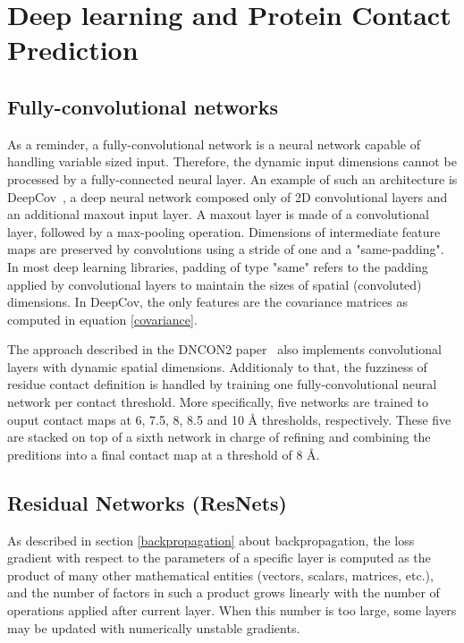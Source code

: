 \section{Deep learning and Protein Contact Prediction}

    \subsection{Fully-convolutional networks}

        As a reminder, a fully-convolutional network is a neural network capable
        of handling variable sized input. Therefore, the dynamic input dimensions
        cannot be processed by a fully-connected neural layer.
        An example of such an architecture is DeepCov~\cite{doi:10.1093/bioinformatics/bty341},
        a deep neural network composed only of 2D convolutional layers and an additional
        maxout input layer. A maxout layer is made of a convolutional layer, followed
        by a max-pooling operation. Dimensions of intermediate feature maps are preserved
        by convolutions using a stride of one and a "same-padding". In most deep learning
        libraries, padding of type "same" refers to the padding applied by convolutional layers
        to maintain the sizes of spatial (convoluted) dimensions.
        In DeepCov, the only features are the covariance matrices as computed
        in equation \ref{covariance}.

        The approach described in the DNCON2 paper~\cite{doi:10.1093/bioinformatics/bty341}
        also implements convolutional layers with dynamic spatial dimensions.
        Additionaly to that, the fuzziness of residue contact definition is handled
        by training one fully-convolutional neural network per contact threshold.
        More specifically, five networks are trained to ouput contact maps at 6, 7.5, 8, 8.5 and 10 \AA{}
        thresholds, respectively. These five are stacked on top of a sixth network in charge
        of refining and combining the preditions into a final contact map at a threshold of 8 \AA{}.

    \subsection{Residual Networks (ResNets)}

        As described in section \ref{backpropagation} about backpropagation,
        the loss gradient with respect to the parameters of a specific layer
        is computed as the product of many other mathematical entities
        (vectors, scalars, matrices, etc.), and the number of factors in such
        a product grows linearly with the number of operations applied after
        current layer. When this number is too large, some layers may be
        updated with numerically unstable gradients.

